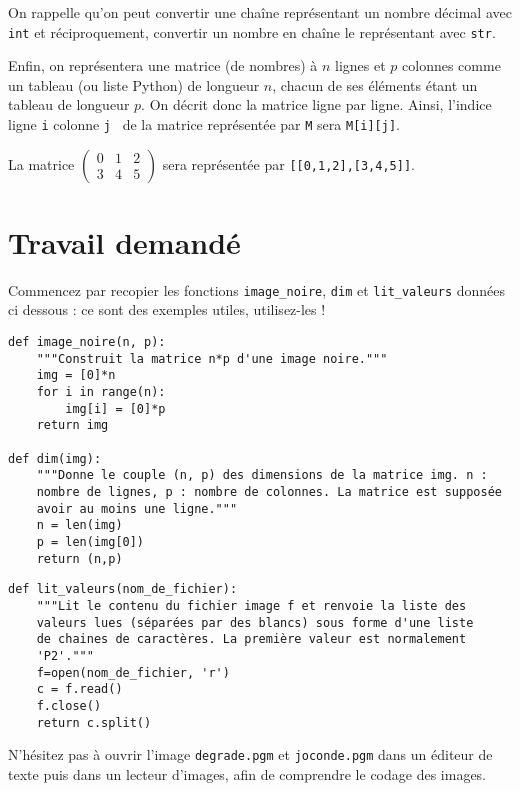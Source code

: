 \bigskip On rappelle qu'on peut convertir une chaîne représentant un nombre
décimal avec \texttt{int} et réciproquement, convertir un nombre en chaîne
le représentant avec \texttt{str}.

\bigskip Enfin, on représentera une matrice (de nombres) à $n$ lignes et $p$ colonnes comme un tableau (ou liste Python) de longueur $n$, chacun de ses éléments étant un tableau de longueur $p$. On décrit donc la matrice ligne par ligne. 
Ainsi, l'indice \og ligne \texttt{i} colonne \texttt{j} \fg\ de la matrice représentée par \texttt{M} sera \texttt{M[i][j]}.
\begin{exemple}
	La matrice $\begin{pmatrix} 0&1&2 \\ 3&4&5 \end{pmatrix}$ sera représentée par \texttt{[[0,1,2],[3,4,5]]}.
\end{exemple}


\section*{Travail demandé}

Commencez par recopier les fonctions  \texttt{image\_noire}, \texttt{dim} et  \texttt{lit\_valeurs} données ci dessous : ce sont des exemples utiles, utilisez-les ! 

\begin{lstlisting}
def image_noire(n, p):
    """Construit la matrice n*p d'une image noire."""
    img = [0]*n
    for i in range(n):
        img[i] = [0]*p
    return img
	
def dim(img):
    """Donne le couple (n, p) des dimensions de la matrice img. n :
    nombre de lignes, p : nombre de colonnes. La matrice est supposée
    avoir au moins une ligne."""
    n = len(img)
    p = len(img[0])
    return (n,p)
\end{lstlisting}

\begin{lstlisting}
def lit_valeurs(nom_de_fichier):
    """Lit le contenu du fichier image f et renvoie la liste des
    valeurs lues (séparées par des blancs) sous forme d'une liste
    de chaines de caractères. La première valeur est normalement
    'P2'."""
    f=open(nom_de_fichier, 'r')
    c = f.read()
    f.close()
    return c.split()
\end{lstlisting}



N'hésitez pas à ouvrir l'image \texttt{degrade.pgm} et \texttt{joconde.pgm} dans un éditeur de texte puis dans un lecteur d'images, afin de comprendre le codage des images.


